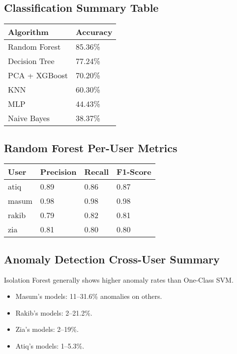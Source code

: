 \documentclass[
  12pt,
]{article}
\providecommand{\tightlist}{%
  \setlength{\itemsep}{0pt}\setlength{\parskip}{0pt}}
\begin{document}
\subsection{Classification Summary
Table}\label{classification-summary-table}

\begin{longtable}[]{@{}ll@{}}
\toprule\noalign{}
Algorithm & Accuracy \\
\midrule\noalign{}
\endhead
\bottomrule\noalign{}
\endlastfoot
Random Forest & 85.36\% \\
Decision Tree & 77.24\% \\
PCA + XGBoost & 70.20\% \\
KNN & 60.30\% \\
MLP & 44.43\% \\
Naive Bayes & 38.37\% \\
\end{longtable}

\subsection{Random Forest Per-User
Metrics}\label{random-forest-per-user-metrics}

\begin{longtable}[]{@{}llll@{}}
\toprule\noalign{}
User & Precision & Recall & F1-Score \\
\midrule\noalign{}
\endhead
\bottomrule\noalign{}
\endlastfoot
atiq & 0.89 & 0.86 & 0.87 \\
masum & 0.98 & 0.98 & 0.98 \\
rakib & 0.79 & 0.82 & 0.81 \\
zia & 0.81 & 0.80 & 0.80 \\
\end{longtable}

\subsection{Anomaly Detection Cross-User
Summary}\label{anomaly-detection-cross-user-summary}

Isolation Forest generally shows higher anomaly rates than One-Class
SVM.

\begin{itemize}
\tightlist
\item
  Masum's models: 11--31.6\% anomalies on others.
\item
  Rakib's models: 2--21.2\%.
\item
  Zia's models: 2--19\%.
\item
  Atiq's models: 1--5.3\%.
\end{itemize}
\end{document}
